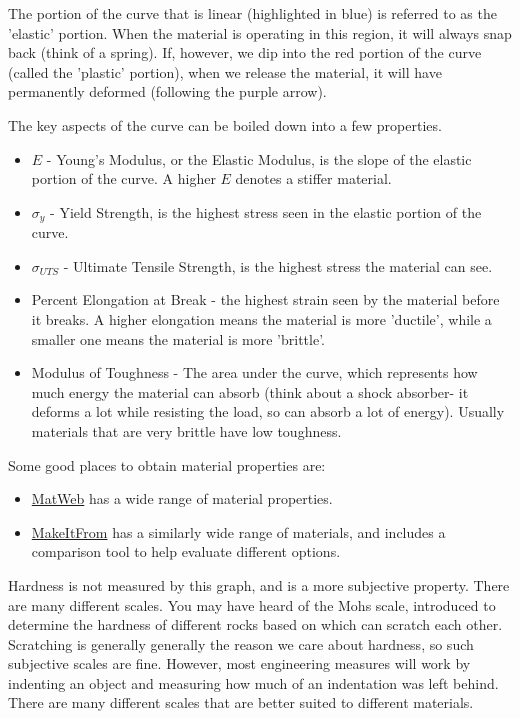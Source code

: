 \documentclass[10pt,letterpaper]{book}
\begin{document}
 The portion of the curve that is linear (highlighted in blue) is referred to as the 'elastic' portion. When the material is operating in this region, it will always snap back (think of a spring). If, however, we dip into the red portion of the curve (called the 'plastic' portion), when we release the material, it will have permanently deformed (following the purple arrow).
 
 The key aspects of the curve can be boiled down into a few properties.
 
 \begin{itemize}
 	\item $E$ - Young's Modulus, or the Elastic Modulus, is the slope of the elastic portion of the curve. A higher $E$ denotes a stiffer material.
 	\item $\sigma_{y}$ - Yield Strength, is the highest stress seen in the elastic portion of the curve.
 	\item $\sigma_{UTS}$ - Ultimate Tensile Strength, is the highest stress the material can see.
 	\item Percent Elongation at Break - the highest strain seen by the material before it breaks. A higher elongation means the material is more 'ductile', while a smaller one means the material is more 'brittle'.
 	\item Modulus of Toughness - The area under the curve, which represents how much energy the material can absorb (think about a shock absorber- it deforms a lot while resisting the load, so can absorb a lot of energy). Usually materials that are very brittle have low toughness.
 \end{itemize}
 
 Some good places to obtain material properties are:
 
 \begin{itemize}
 	\item \href{http://www.matweb.com/search/DataSheet.aspx?MatGUID=3a2e111b27ef4e5d813bad6044b3f318&ckck=1}{\color{red}MatWeb} has a wide range of material properties.
 	\item \href{https://www.makeitfrom.com/}{\color{red}MakeItFrom} has a similarly wide range of materials, and includes a comparison tool to help evaluate different options.
 \end{itemize}
 
 Hardness is not measured by this graph, and is a more subjective property. There are many different scales. You may have heard of the Mohs scale, introduced to determine the hardness of different rocks based on which can scratch each other. Scratching is generally generally the reason we care about hardness, so such subjective scales are fine. However, most engineering measures will work by indenting an object and measuring how much of an indentation was left behind. There are many different scales that are better suited to different materials.
 
\end{document}
